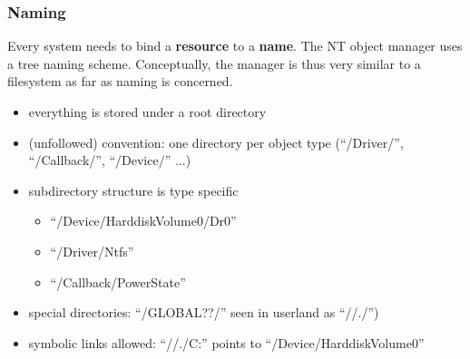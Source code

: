 \begin{frame}
  \frametitle{Naming}

  Every system needs to bind a \textbf{resource} to a \textbf{name}. The NT object
  manager uses a tree naming scheme. Conceptually, the manager is thus very similar
  to a filesystem as far as naming is concerned.

  \begin{itemize}
    \item
      everything is stored  under a root directory
    \item
      (unfollowed) convention: one directory per object type (``/Driver/'', ``/Callback/'', ``/Device/'' ...)
    \item
      subdirectory structure is type specific

      \begin{itemize}
        \item
          ``/Device/HarddiskVolume0/Dr0''
        \item
          ``/Driver/Ntfs''
        \item
          ``/Callback/PowerState''
      \end{itemize}

    \item
      special directories: ``/GLOBAL??/'' seen in userland as ``//./'')
    \item
      symbolic links allowed: ``//./C:'' points to ``/Device/HarddiskVolume0''
  \end{itemize}

\end{frame}



